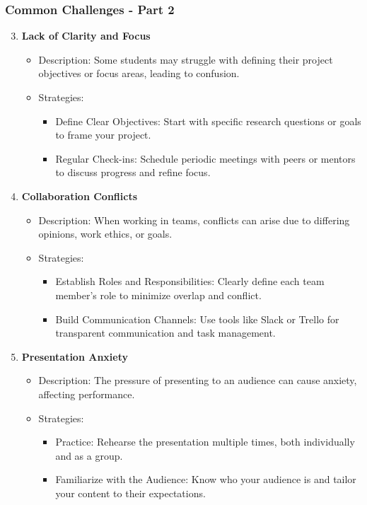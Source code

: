 \documentclass[aspectratio=169]{beamer}
\begin{document}
\begin{frame}[fragile]
    \frametitle{Common Challenges - Part 2}
    \begin{enumerate}
        \setcounter{enumi}{2} %
        \item \textbf{Lack of Clarity and Focus}
            \begin{itemize}
                \item Description: Some students may struggle with defining their project objectives or focus areas, leading to confusion.
                \item Strategies:
                    \begin{itemize}
                        \item Define Clear Objectives: Start with specific research questions or goals to frame your project.
                        \item Regular Check-ins: Schedule periodic meetings with peers or mentors to discuss progress and refine focus.
                    \end{itemize}
            \end{itemize}

        \item \textbf{Collaboration Conflicts}
            \begin{itemize}
                \item Description: When working in teams, conflicts can arise due to differing opinions, work ethics, or goals.
                \item Strategies:
                    \begin{itemize}
                        \item Establish Roles and Responsibilities: Clearly define each team member’s role to minimize overlap and conflict.
                        \item Build Communication Channels: Use tools like Slack or Trello for transparent communication and task management.
                    \end{itemize}
            \end{itemize}
        
        \item \textbf{Presentation Anxiety}
            \begin{itemize}
                \item Description: The pressure of presenting to an audience can cause anxiety, affecting performance.
                \item Strategies:
                    \begin{itemize}
                        \item Practice: Rehearse the presentation multiple times, both individually and as a group.
                        \item Familiarize with the Audience: Know who your audience is and tailor your content to their expectations.
                    \end{itemize}
            \end{itemize}
    \end{enumerate}
\end{frame}
\end{document}
